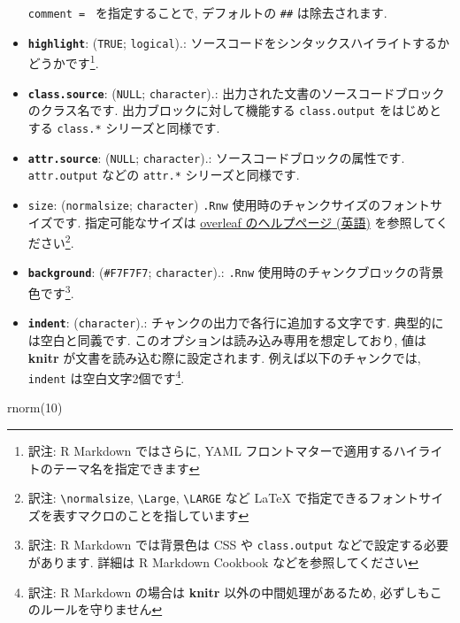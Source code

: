 \documentclass[
]{bxjsreport}
\newenvironment{Shaded}{\begin{snugshade}}{\end{snugshade}}
\newcommand{\DecValTok}[1]{\textcolor[rgb]{0.00,0.00,0.81}{#1}}
\newcommand{\FunctionTok}[1]{\textcolor[rgb]{0.00,0.00,0.00}{#1}}
\newcommand{\NormalTok}[1]{#1}
\begin{document}
\begin{itemize}
  \texttt{comment\ =\ \textquotesingle{}\textquotesingle{}}
  を指定することで, デフォルトの \texttt{\#\#} は除去されます.
\item
  \textbf{\texttt{highlight}}: (\texttt{TRUE}; \texttt{logical}).:
  ソースコードをシンタックスハイライトするかどうかです\footnote{訳注: R
    Markdown ではさらに, YAML
    フロントマターで適用するハイライトのテーマ名を指定できます}.
\item
  \textbf{\texttt{class.source}}: (\texttt{NULL}; \texttt{character}).:
  出力された文書のソースコードブロックのクラス名です.
  出力ブロックに対して機能する \texttt{class.output} をはじめとする
  \texttt{class.*} シリーズと同様です.
\item
  \textbf{\texttt{attr.source}}: (\texttt{NULL}; \texttt{character}).:
  ソースコードブロックの属性です. \texttt{attr.output} などの
  \texttt{attr.*} シリーズと同様です.
\item
  \texttt{size}:
  (\texttt{\textquotesingle{}normalsize\textquotesingle{}};
  \texttt{character}) \texttt{.Rnw}
  使用時のチャンクサイズのフォントサイズです. 指定可能なサイズは
  \href{https://www.overleaf.com/learn/latex/Font_sizes,_families,_and_styles}{overleaf
  のヘルプページ (英語)} を参照してください\footnote{訳注:
    \texttt{\textbackslash{}normalsize}, \texttt{\textbackslash{}Large},
    \texttt{\textbackslash{}LARGE} など LaTeX
    で指定できるフォントサイズを表すマクロのことを指しています}.
\item
  \textbf{\texttt{background}}:
  (\texttt{\textquotesingle{}\#F7F7F7\textquotesingle{}};
  \texttt{character}).: \texttt{.Rnw}
  使用時のチャンクブロックの背景色です\footnote{訳注: R Markdown
    では背景色は CSS や \texttt{class.output}
    などで設定する必要があります. 詳細は R Markdown Cookbook
    などを参照してください}.
\item
  \textbf{\texttt{indent}}: (\texttt{character}).:
  チャンクの出力で各行に追加する文字です. 典型的には空白と同義です.
  このオプションは読み込み専用を想定しており, 値は \textbf{knitr}
  が文書を読み込む際に設定されます. 例えば以下のチャンクでは,
  \texttt{indent} は空白文字2個です\footnote{訳注: R Markdown の場合は
    \textbf{knitr} 以外の中間処理があるため,
    必ずしもこのルールを守りません}.
\end{itemize}

\begin{Shaded}
\begin{Highlighting}[numbers=left,,]
\FunctionTok{rnorm}\NormalTok{(}\DecValTok{10}\NormalTok{)}
\end{Highlighting}
\end{Shaded}
\end{document}
